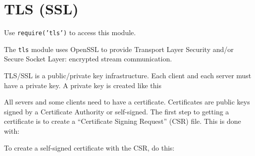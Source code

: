 \section{TLS (SSL)}\label{tls-ssl}

\begin{Shaded}
\begin{Highlighting}[]
 
\end{Highlighting}
\end{Shaded}

Use \texttt{require('tls')} to access this module.

The \texttt{tls} module uses OpenSSL to provide Transport Layer Security
and/or Secure Socket Layer: encrypted stream communication.

TLS/SSL is a public/private key infrastructure. Each client and each
server must have a private key. A private key is created like this

\begin{Shaded}
\begin{Highlighting}[]
 
\end{Highlighting}
\end{Shaded}

All severs and some clients need to have a certificate. Certificates are
public keys signed by a Certificate Authority or self-signed. The first
step to getting a certificate is to create a ``Certificate Signing
Request'' (CSR) file. This is done with:

\begin{Shaded}
\begin{Highlighting}[]
  
\end{Highlighting}
\end{Shaded}

To create a self-signed certificate with the CSR, do this:

\begin{Shaded}
\begin{Highlighting}[]
   
\end{Highlighting}
\end{Shaded}

